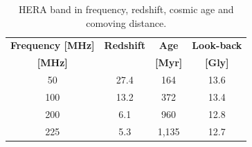 \documentclass[ars]{/Users/daviddeboer1/Documents/Papers/Copernicus_LaTeX_Package_v_2_7/copernicus}
\begin{document}


\begin{table}[t]
\caption{HERA band in frequency, redshift, cosmic age and comoving distance.}
\label{tab:heraband}
\vskip4mm
\centering
\begin{tabular}{| c | c | c | c |} \hline
\textbf{Frequency [MHz]} & \textbf{Redshift} & \textbf{Age} & \textbf{Look-back} \\
\textbf{[MHz]}                   &                            & \textbf{[Myr]}  & \textbf{[Gly]} \\ \hline
50 & 27.4    & 164 & 13.6 \\ \hline
100 & 13.2  & 372 & 13.4 \\ \hline
200  & 6.1    & 960  & 12.8 \\ \hline
225  &  5.3   & 1,135  &  12.7 \\ \hline
\end{tabular}
\end{table}





\end{document}
